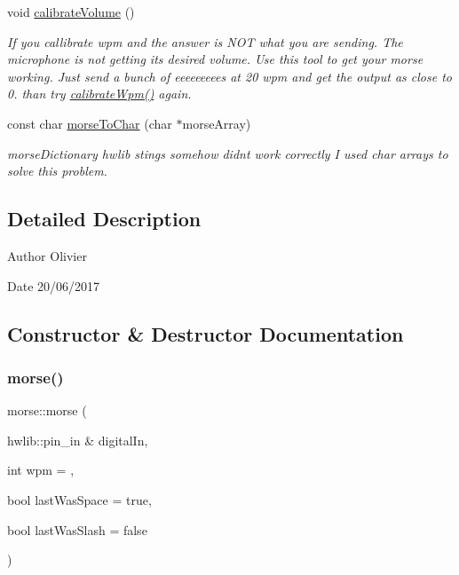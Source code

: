 \begin{DoxyCompactItemize}
\mbox{\label{classmorse_a8bc8252cbf54933b5e1d6d0c5242e195}} 
void \hyperlink{classmorse_a8bc8252cbf54933b5e1d6d0c5242e195}{calibrate\+Volume} ()
\begin{DoxyCompactList}\small\item\em If you callibrate wpm and the answer is N\+OT what you are sending. The microphone is not getting it\textquotesingle{}s desired volume. Use this tool to get your morse working. Just send a bunch of eeeeeeeee\textquotesingle{}s at 20 wpm and get the output as close to 0. than try \hyperlink{classmorse_ad4da7cb937ff264bb0b27d7cb13b5207}{calibrate\+Wpm()} again. \end{DoxyCompactList}\item 
const char \hyperlink{classmorse_a697d50fc8f58b68626cd5e80297cfde6}{morse\+To\+Char} (char $\ast$morse\+Array)
\begin{DoxyCompactList}\small\item\em morse\+Dictionary hwlib stings somehow didn\textquotesingle{}t work correctly I used char arrays to solve this problem. \end{DoxyCompactList}\end{DoxyCompactItemize}


\subsection{Detailed Description}
\begin{DoxyAuthor}{Author}
Olivier 
\end{DoxyAuthor}
\begin{DoxyDate}{Date}
20/06/2017 
\end{DoxyDate}


\subsection{Constructor \& Destructor Documentation}
\mbox{\label{classmorse_a8a972ad05a82519e2dfeb9c189c3a5c1}} 
\subsubsection{\texorpdfstring{morse()}{morse()}}
{\footnotesize\ttfamily morse\+::morse (\begin{DoxyParamCaption}\item[{hwlib\+::pin\+\_\+in \&}]{digital\+In,  }\item[{int}]{wpm = {},  }\item[{bool}]{last\+Was\+Space = {\ttfamily true},  }\item[{bool}]{last\+Was\+Slash = {\ttfamily false} }\end{DoxyParamCaption})}



